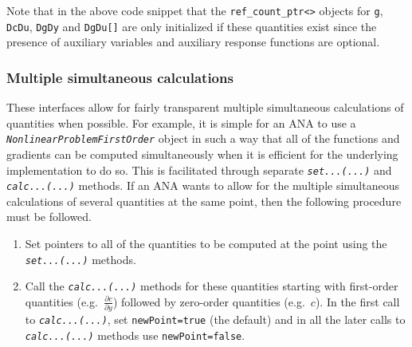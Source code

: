 Note that in the above code snippet that the
\texttt{ref\_count\_ptr<>} objects for \texttt{g}, \texttt{DcDu},
\texttt{DgDy} and \texttt{DgDu[]} are only initialized if these quantities
exist since the presence of auxiliary variables and auxiliary response
functions are optional.

%
\subsubsection{Multiple simultaneous calculations}
%

These interfaces allow for fairly transparent multiple simultaneous
calculations of quantities when possible.  For example, it is simple
for an ANA to use a \texttt{\textit{Nonlinear\-Problem\-First\-Order}}
object in such a way that all of the functions and gradients can be
computed simultaneously when it is efficient for the underlying
implementation to do so.  This is facilitated through separate
\texttt{\textit{set...(...)}} and \texttt{\textit{calc...(...)}} methods.
If an ANA wants to allow for the multiple simultaneous calculations of
several quantities at the same point, then the following procedure
must be followed.

\begin{enumerate}
\item Set pointers to all of the quantities to be computed at the point
using the \texttt{\textit{set...(...)}} methods.
\item Call the \texttt{\textit{calc...(...)}} methods for these quantities
starting with first-order quantities (e.g.~$\frac{\partial c}{\partial
y}$) followed by zero-order quantities (e.g.~$c$).  In the first call
to \texttt{\textit{calc...(...)}}, set \texttt{newPoint=true} (the default) and
in all the later calls to \texttt{\textit{calc...(...)}} methods use
\texttt{newPoint=false}.
\end{enumerate}

